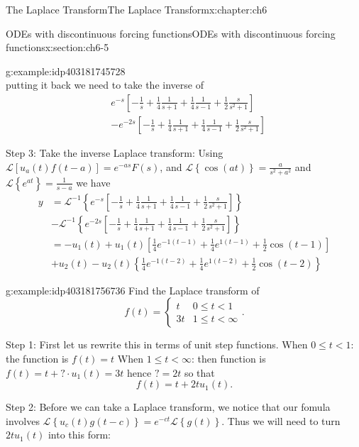 \documentclass[oneside,10pt,]{book}
\numberwithin{equation}{section}
\numberwithin{equation}{section}
\newcommand{\lt}{<}
\newcommand{\amp}{&}
\begin{document}
\begin{chapterptx}{The Laplace Transform}{}{The Laplace Transform}{}{}{x:chapter:ch6}
\begin{sectionptx}{ODEs with discontinuous forcing functions}{}{ODEs with discontinuous forcing functions}{}{}{x:section:ch6-5}
\begin{example}{}{g:example:idp403181745728}
\begin{equation*}
\end{equation*}
putting it back we need to take the inverse of%
\begin{align*}
\amp e^{-s}\left[-\frac{1}{s}+\frac{1}{4}\frac{1}{s+1}+\frac{1}{4}\frac{1}{s-1}+\frac{1}{2}\frac{s}{s^{2}+1}\right]\\
\amp -e^{-2s}\left[-\frac{1}{s}+\frac{1}{4}\frac{1}{s+1}+\frac{1}{4}\frac{1}{s-1}+\frac{1}{2}\frac{s}{s^{2}+1}\right]
\end{align*}
%
\par
Step 3: Take the inverse Laplace transform: Using \(\mathcal{L}\left[u_{a}(t)f(t-a)\right]=e^{-as}F(s)\), and \(\mathcal{L}\left\{ \cos(at)\right\} =\frac{a}{s^{2}+a^{2}}\) and \(\mathcal{L}\left\{ e^{at}\right\} =\frac{1}{s-a}\) we have%
\begin{align*}
y \amp =\mathcal{L}^{-1}\left\{ e^{-s}\left[-\frac{1}{s}+\frac{1}{4}\frac{1}{s+1}+\frac{1}{4}\frac{1}{s-1}+\frac{1}{2}\frac{s}{s^{2}+1}\right]\right\} \\
\amp -\mathcal{L}^{-1}\left\{ e^{-2s}\left[-\frac{1}{s}+\frac{1}{4}\frac{1}{s+1}+\frac{1}{4}\frac{1}{s-1}+\frac{1}{2}\frac{s}{s^{2}+1}\right]\right\} \\
\amp =-u_{1}(t)+u_{1}(t)\left[\frac{1}{4}e^{-1\left(t-1\right)}+\frac{1}{4}e^{1\left(t-1\right)}+\frac{1}{2}\cos\left(t-1\right)\right]\\
\amp +u_{2}(t)-u_{2}(t)\left\{ \frac{1}{4}e^{-1\left(t-2\right)}+\frac{1}{4}e^{1\left(t-2\right)}+\frac{1}{2}\cos\left(t-2\right)\right\} 
\end{align*}
%
\end{example}
\begin{example}{}{g:example:idp403181756736}%
Find the Laplace transform of%
\begin{equation*}
f(t)=\begin{cases}
t \amp 0\leq t\lt 1\\
3t \amp 1\leq t\lt\infty
\end{cases}.
\end{equation*}
%
\par
Step 1: First let us rewrite this in terms of unit step functions. When \(0\leq t\lt 1\): the function is \(f(t)=t\) When \(1\leq t\lt \infty\): then function is \(f(t)=t+?\cdot u_{1}(t)=3t\) hence \(?=2t\) so that%
\begin{equation*}
f(t)=t+2tu_{1}(t).
\end{equation*}
%
\par
Step 2: Before we can take a Laplace transform, we notice that our fomula involves \(\mathcal{L}\left\{ u_{c}(t)g\left(t-c\right)\right\} =e^{-ct}\mathcal{L}\left\{ g(t)\right\} \). Thus we will need to turn \(2tu_{1}(t)\) into this form:%

\end{example}
\end{sectionptx}
\end{chapterptx}
\end{document}
